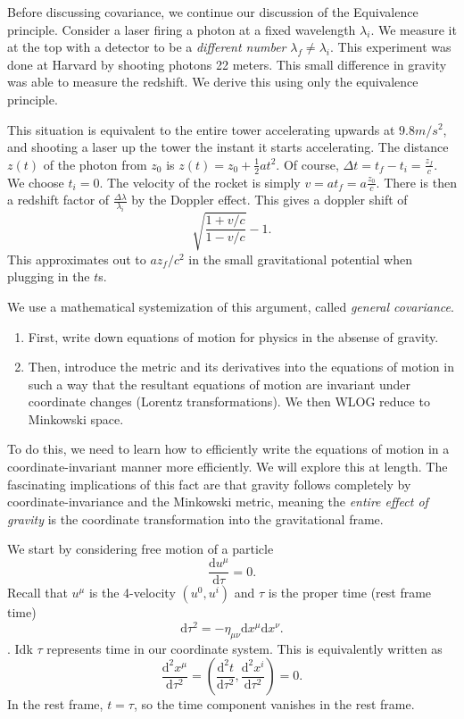 
Before discussing covariance, we continue our discussion of the Equivalence principle. Consider a laser firing a photon at a fixed wavelength $\lambda _i$. We measure it at the top with a detector to be a \emph{different number} $\lambda _f \neq \lambda _i$. This experiment was done at Harvard by shooting photons 22 meters. This small difference in gravity was able to measure the redshift. We derive this using only the equivalence principle.

This situation is equivalent to the entire tower accelerating upwards at $9.8m/s^2$, and shooting a laser up the tower the instant it starts accelerating. The distance $z(t)$ of the photon from $z_0$ is $z(t) = z_0+\frac{1}{2} at^2$. Of course, $\Delta t=t_f-t_i=\frac{z_f}{c} $. We choose $t_i=0$. The velocity of the rocket is simply $v=at_f=a\frac{z_0}{c} $. There is then a redshift factor of $\frac{\Delta \lambda }{\lambda _i}  $ by the Doppler effect. This gives a doppler shift of
\[
	\sqrt{\frac{1+v/c}{1-v/c} } -1
.\]
This approximates out to $az_f/c^2$ in the small gravitational potential when plugging in the $t$s.

We use a mathematical systemization of this argument, called \emph{general covariance}.

\begin{enumerate}
	\item First, write down equations of motion for physics in the absense of gravity.
	\item Then, introduce the metric and its derivatives into the equations of motion in such a way that the resultant equations of motion are invariant under coordinate changes (Lorentz transformations). We then WLOG reduce to Minkowski space.
\end{enumerate}

To do this, we need to learn how to efficiently write the equations of motion in a coordinate-invariant manner more efficiently. We will explore this at length. The fascinating implications of this fact are that gravity follows completely by coordinate-invariance and the Minkowski metric, meaning the \emph{entire effect of gravity} is the coordinate transformation into the gravitational frame.

We start by considering free motion of a particle
\[
	\frac{\mathrm{d}u^\mu }{\mathrm{d}\tau } =0
.\]
Recall that $u^\mu $ is  the 4-velocity $(u^0,u^i)$ and $\tau $ is the proper time (rest frame time)
\[
	\mathrm{d} \tau ^2=-\eta _{\mu \nu } \mathrm{d} x^\mu \mathrm{d} x^\nu 
.\]
. Idk $\tau $ represents time in our coordinate system. This is equivalently written as
\[
	\frac{\mathrm{d}^2x^\mu }{\mathrm{d}\tau ^2} =\left( \frac{\mathrm{d}^2t}{\mathrm{d}\tau ^2} ,\frac{\mathrm{d}^2x^i}{\mathrm{d}\tau ^2}  \right) =0
.\]
In the rest frame, $t=\tau $, so the time component vanishes in the rest frame.

